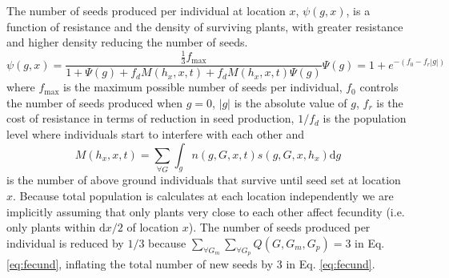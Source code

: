 \documentclass[10pt,letterpaper]{article}
\begin{document}
The number of seeds produced per individual at location $x$, $\psi(g, x)$, is a function of resistance and the density of surviving plants, with greater resistance and higher density reducing the number of seeds. 
\begin{subequations}
\begin{equation}\label{eq:seed_production}
	\psi(g, x) = \frac{\frac{1}{3}f_\text{max}}{1 + \Psi(g) + f_d M(h_x, x, t) + f_dM(h_x, x, t) \Psi(g)}
\end{equation}  
\begin{equation}
	\Psi(g) = 1 + e^{-(f_0 - f_r|g|)}
\end{equation}
\end{subequations}
where $f_\text{max}$ is the maximum possible number of seeds per individual, $f_0$ controls the number of seeds produced when $g = 0$, $|g|$ is the absolute value of $g$, $f_r$ is the cost of resistance in terms of reduction in seed production, $1/f_d$ is the population level where individuals start to interfere with each other and 
\begin{equation}\label{eq:num_sur}
   M(h_x, x, t) = \sum_{\forall G} \int_g n(g, G, x, t)s(g, G, x, h_x)\text{d}g
\end{equation}
is the number of above ground individuals that survive until seed set at location $x$. Because total population is calculates at each location independently we are implicitly assuming that only plants very close to each other affect fecundity (i.e. only plants within $\text{d}x / 2$ of location $x$). The number of seeds produced per individual is reduced by $1/3$ because $\sum_{\forall G_m}\sum_{\forall G_p} Q(G, G_m, G_p) = 3$ in Eq. \ref{eq:fecund}, inflating the total number of new seeds by 3 in Eq. \ref{eq:fecund}.    
\end{document}
